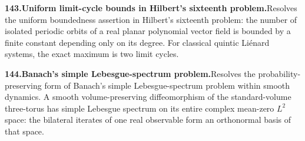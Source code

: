 \documentclass[11pt,a4paper]{article}
\begin{document}
  \par \begin{minipage}{\linewidth}
  \fontsize{10.5}{12.6}\selectfont\RaggedRight
  \hypertarget{result 143}{}
  {\bfseries\textcolor{muted}{143.}\enspace Uniform limit-cycle bounds in Hilbert's sixteenth problem.}\enspace Resolves the uniform boundedness assertion in Hilbert's sixteenth problem: the number of isolated periodic orbits of a real planar polynomial vector field is bounded by a finite constant depending only on its degree. For classical quintic Li\'enard systems, the exact maximum is two limit cycles.\par
  \end{minipage}\par\vspace{5pt}



  \par \begin{minipage}{\linewidth}
  \fontsize{10.5}{12.6}\selectfont\RaggedRight
  \hypertarget{result 144}{}
  {\bfseries\textcolor{muted}{144.}\enspace Banach's simple Lebesgue-spectrum problem.}\enspace Resolves the probability-preserving form of Banach's simple Lebesgue-spectrum problem within smooth dynamics. A smooth volume-preserving diffeomorphism of the standard-volume three-torus has simple Lebesgue spectrum on its entire complex mean-zero $L^2$ space: the bilateral iterates of one real observable form an orthonormal basis of that space.\par
  \end{minipage}\par\vspace{5pt}
\end{document}
